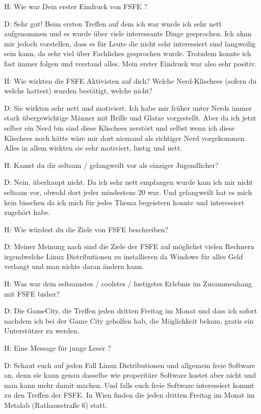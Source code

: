 H: Wie war Dein erster Eindruck von FSFE ?


D: Sehr gut! Beim ersten Treffen auf dem ich war wurde ich sehr nett aufgenommen und es wurde über viele interessante
   Dinge gesprochen. Ich aknn mir jedoch vorstellen, dass es für Leute die nicht sehr interessiert sind langweilig sein kann,
   da sehr viel über Fachliches gesprochen wurde. Trotzdem konnte ich fast immer folgen und verstand alles. Mein erster
   Eindruck war also sehr positiv.





H: Wie wirkten die FSFE Aktivisten auf dich? Welche Nerd-Klischees (sofern du welche hattest) wurden bestätigt, 
   welche nicht?


D: Sie wirkten sehr nett und motiviert. Ich habe mir früher unter Nerds immer stark übergewichtige Männer mit Brille und Glatze
   vorgestellt. Aber da ich jetzt selber ein Nerd bin sind diese Klischees zerstört und selbst wenn ich diese Klischees noch
   hätte wäre mir dort niemand als richtiger Nerd vorgekommen. Alles in allem wirkten sie sehr motiviert, lustig und nett.





H: Kamst du dir seltsam / gelangweilt vor als einziger Jugendlicher?


D: Nein, überhaupt nicht. Da ich sehr nett empfangen wurde kam ich mir nicht seltsam vor, obwohl dort jeder mindestens 20 war.
   Und gelangweilt hat es mich kein bisschen da ich mich für jedes Thema begeistern konnte und interessiert zugehört habe.





H: Wie würdest du die Ziele von FSFE beschreiben?


D: Meiner Meinung nach sind die Ziele der FSFE auf möglichst vielen Rechnern irgendwelche Linux Distributionen zu installieren
   da Windows für alles Geld verlangt und man nichts daran ändern kann.





H: Was war dein seltsamstes / coolstes / lustigstes Erlebnis im Zusammenhang mit FSFE bisher?


D: Die GameCity, die Treffen jeden dritten Freitag im Monat und dass ich sofort nachdem ich bei der Game City geholfen hab, die
   Möglichkeit bekam, gratis ein Unterstützer zu werden.





H: Eine Message für junge Leser ?


D: Schaut euch auf jeden Fall Linux Distributionen und allgemein freie Software an, denn sie kann genau dasselbe wie
   properitäre Software kostet aber nicht und man kann mehr damit machen. Und falls euch freie Software interessiert kommt
   zu den Treffen der FSFE. In Wien finden die jeden dritten Freitag im Monat im Metalab (Rathausstraße 6) statt.




